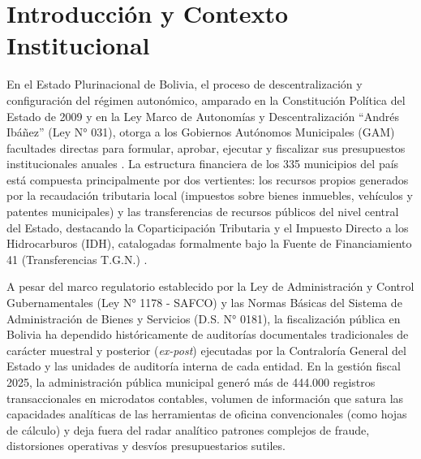 \documentclass[11pt,a4paper]{article}
\begin{document}
\clearpage

\setcounter{page}{1}

\tableofcontents
\clearpage

\listoffigures
\clearpage

\listoftables
\clearpage

\setcounter{page}{1}

\section{Introducción y Contexto Institucional}
En el Estado Plurinacional de Bolivia, el proceso de descentralización y configuración del régimen autonómico, amparado en la Constitución Política del Estado de 2009 y en la Ley Marco de Autonomías y Descentralización ``Andrés Ibáñez'' (Ley N° 031), otorga a los Gobiernos Autónomos Municipales (GAM) facultades directas para formular, aprobar, ejecutar y fiscalizar sus presupuestos institucionales anuales \citep{ley031autonomias}. La estructura financiera de los 335 municipios del país está compuesta principalmente por dos vertientes: los recursos propios generados por la recaudación tributaria local (impuestos sobre bienes inmuebles, vehículos y patentes municipales) y las transferencias de recursos públicos del nivel central del Estado, destacando la Coparticipación Tributaria y el Impuesto Directo a los Hidrocarburos (IDH), catalogadas formalmente bajo la Fuente de Financiamiento 41 (Transferencias T.G.N.) \citep{mefp2025clasificador}.

A pesar del marco regulatorio establecido por la Ley de Administración y Control Gubernamentales (Ley N° 1178 - SAFCO) y las Normas Básicas del Sistema de Administración de Bienes y Servicios (D.S. N° 0181), la fiscalización pública en Bolivia ha dependido históricamente de auditorías documentales tradicionales de carácter muestral y posterior (\textit{ex-post}) ejecutadas por la Contraloría General del Estado y las unidades de auditoría interna de cada entidad. En la gestión fiscal 2025, la administración pública municipal generó más de 444.000 registros transaccionales en microdatos contables, volumen de información que satura las capacidades analíticas de las herramientas de oficina convencionales (como hojas de cálculo) y deja fuera del radar analítico patrones complejos de fraude, distorsiones operativas y desvíos presupuestarios sutiles.
\end{document}
